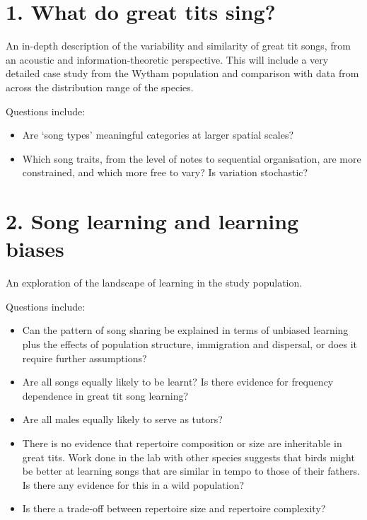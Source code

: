 \documentclass[]{report}
\providecommand{\tightlist}{%
  \setlength{\itemsep}{0pt}\setlength{\parskip}{0pt}}
\begin{document}
\hypertarget{what-do-great-tits-sing}{%
\section{1. What do great tits sing?}\label{what-do-great-tits-sing}}

An in-depth description of the variability and similarity of great tit
songs, from an acoustic and information-theoretic perspective. This will
include a very detailed case study from the Wytham population and
comparison with data from across the distribution range of the species.

Questions include:

\begin{itemize}
\tightlist
\item
  Are `song types' meaningful categories at larger spatial scales?
\item
  Which song traits, from the level of notes to sequential organisation,
  are more constrained, and which more free to vary? Is variation
  stochastic?
\end{itemize}

\hypertarget{song-learning-and-learning-biases}{%
\section{2. Song learning and learning
biases}\label{song-learning-and-learning-biases}}

An exploration of the landscape of learning in the study population.

Questions include:

\begin{itemize}
\item
  Can the pattern of song sharing be explained in terms of unbiased
  learning plus the effects of population structure, immigration and
  dispersal, or does it require further assumptions?
\item
  Are all songs equally likely to be learnt? Is there evidence for
  frequency dependence in great tit song learning?
\item
  Are all males equally likely to serve as tutors?
\item
  There is no evidence that repertoire composition or size are
  inheritable in great tits. Work done in the lab with other species
  suggests that birds might be better at learning songs that are similar
  in tempo to those of their fathers. Is there any evidence for this in
  a wild population?
\item
  Is there a trade-off between repertoire size and repertoire
  complexity?
\end{itemize}
\end{document}
